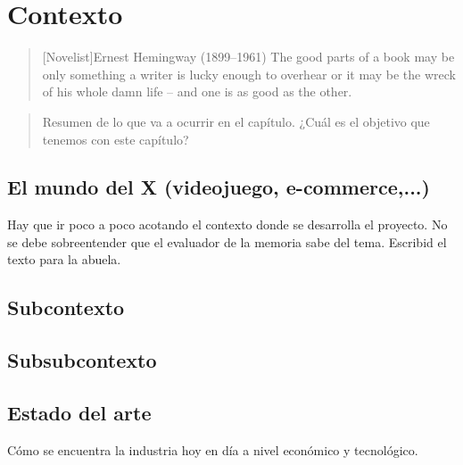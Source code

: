 \chapter{Contexto}

\begin{quotation}[Novelist]{Ernest Hemingway (1899--1961)}
The good parts of a book may be only something a writer is lucky enough to overhear or it may be the wreck of his whole damn life -- and one is as good as the other.
\end{quotation}

\begin{abstract}
Resumen de lo que va a ocurrir en el capítulo. ¿Cuál es el objetivo que tenemos con este capítulo?
\end{abstract}

\section{El mundo del X (videojuego, e-commerce,...)}

Hay que ir poco a poco acotando el contexto donde se desarrolla el proyecto. No se debe sobreentender que el evaluador de la memoria sabe del tema. Escribid el texto para la abuela.

\section{Subcontexto}

\section{Subsubcontexto}

\section{Estado del arte}

Cómo se encuentra la industria hoy en día a nivel económico y tecnológico.